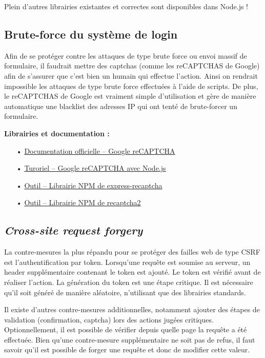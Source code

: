 \documentclass[12pt]{article}
\begin{document}
Plein d'autres librairies existantes et correctes sont disponibles dans Node.js !
\clearpage

\subsection{Brute-force du système de login}
\label{ssec:cm-bruteforce}

Afin de se protéger contre les attaques de type brute force ou envoi massif de formulaire, il faudrait mettre des captchas (comme les reCAPTCHAS de Google) afin de s'assurer que c'est bien un humain qui effectue l'action. Ainsi on rendrait impossible les attaques de type brute force effectuées à l'aide de scripts. De plus, le reCAPTCHAS de Google est vraiment simple d'utilisation et gère de manière automatique une blacklist des adresses IP qui ont tenté de brute-forcer un formulaire.

\medskip
\textbf{Librairies et documentation :}

\begin{itemize}
\item[•] \href{https://www.google.com/recaptcha/intro/v3beta.html}{Documentation officielle -- Google reCAPTCHA}
\item[•] \href{https://codeforgeek.com/2016/03/google-recaptcha-node-js-tutorial/}{Turoriel -- Google reCAPTCHA avec Node.js}
\item[•] \href{https://www.npmjs.com/package/express-recaptcha}{Outil -- Librairie NPM de express-recaptcha}
\item[•] \href{https://www.npmjs.com/package/recaptcha2}{Outil -- Librairie NPM de recaptcha2}
\end{itemize}

\subsection{\emph{Cross-site request forgery}}
\label{ssec:cm-csrf}

La contre-mesures la plus répandu pour se protéger des failles web de type CSRF est l'authentification par token. Lorsqu'une requête est soumise au serveur, un header supplémentaire contenant le token est ajouté. Le token est vérifié avant de réaliser l'action. La génération du token est une étape critique. Il est nécessaire qu'il soit généré de manière aléatoire, n'utilisant que des librairies standards.

Il existe d'autres contre-mesures additionnelles, notamment ajouter des étapes de validation (confirmation, captcha) lors des actions jugées critiques. Optionnellement, il est possible de vérifier depuis quelle page la requête a été effectuée. Bien qu'une contre-mesure supplémentaire ne soit pas de refus, il faut savoir qu'il est possible de forger une requête et donc de modifier cette valeur.
\end{document}
